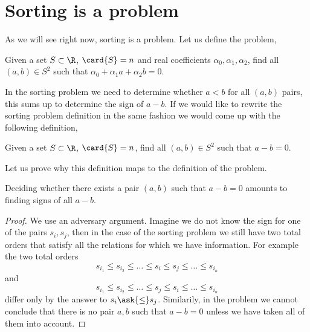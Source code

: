\section{Sorting is a \twoLDT problem}

As we will see right now, sorting is a \twoLDT problem. Let us define the
\twoLDT problem,

\begin{problem}
Given a set $S \subset \R$, $\card{S} = n$ and real coefficients $\alpha_0,
\alpha_1, \alpha_2$, find all $(a,b) \in S^2$ such that
$\alpha_0 + \alpha_1 a + \alpha_2 b = 0$.
\end{problem}

In the sorting problem we need to determine whether $a < b$ for all $(a,b)$
pairs, this sums up to determine the sign of $a-b$. If we would like to rewrite
the sorting problem definition in the same fashion we would come up with the
following definition,

\begin{problem}
Given a set $S \subset \R$, $\card{S} = n$, find all $(a,b) \in S^2$ such that
$a - b = 0$.
\end{problem}

Let us prove why this definition maps to the definition of the \twoLDT
problem.

\begin{theorem}
Deciding whether there exists a pair \((a,b)\) such that \(a - b = 0\)
amounts to finding signs of all \(a-b\).
\end{theorem}

\begin{proof}
We use an adversary argument. Imagine we do not know the sign for one of the
pairs \(s_i,s_j\), then in the case of the sorting problem we still have two
total orders that satisfy all the relations for which we have information. For
example the two total orders
\begin{displaymath}
s_{i_1} \le s_{i_2} \le \ldots \le s_i \le s_j \le \ldots \le s_{i_n}
\end{displaymath}
and
\begin{displaymath}
s_{i_1} \le s_{i_2} \le \ldots \le s_j \le s_i \le \ldots \le s_{i_n}
\end{displaymath}
differ only by the answer to \(s_i \ask{\le} s_j\).
Similarily, in the \twoLDT problem we cannot conclude that there is no pair
\(a,b\) such that \(a-b=0\) unless we have taken all of them into account.
\end{proof}

